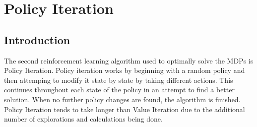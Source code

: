 \documentclass[h]{article}
\begin{document}
 
\section*{Policy Iteration}
\subsection*{Introduction}
The second reinforcement learning algorithm used to optimally solve the MDPs is 
Policy Iteration.  Policy iteration works by beginning with a random policy and then 
attemping to modify it state by state by taking different actions.  This continues throughout each state of the policy in an attempt
 to find a better solution.  When no further policy changes are found, the algorithm 
 is finished.  Policy Iteration tends to take longer than Value Iteration due to 
 the additional number of explorations and calculations being done.
 
\end{document}
